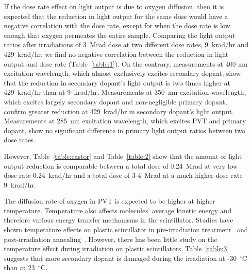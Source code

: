 \documentclass[review]{elsarticle}
\begin{document}
If the dose rate effect on light output is due to oxygen diffusion, then it is expected that the reduction in light output 
for the same dose would have a negative correlation with the dose rate, except for when the dose rate is low enough that 
oxygen permeates the entire sample. 
Comparing the light output ratios after irradiations of 3~Mrad dose at two different dose rates, 9~krad/hr and 429~krad/hr, 
we find no negative correlation between the reduction in light output and dose rate (Table~\ref{table:1}).
On the contrary, measurements at 400 nm excitation wavelength, which almost exclusively excites secondary dopant, 
show that the reduction in secondary dopant's light output is two times higher at 429~krad/hr than at 9~krad/hr.
Measurements at 350~nm excitation wavelength, which excites largely secondary dopant and non-negligible primary dopant, 
confirm greater reduction at 429~krad/hr in secondary dopant's light output. 
Measurements at 285~nm excitation wavelength, which excites PVT and primary dopant, show no significant difference 
in primary light output ratios between two dose rates. 

However, Table~\ref{table:castor} and Table~\ref{table:2} show that the amount of light output reduction is comparable 
between a total dose of 0.24~Mrad at very low dose rate 0.24~krad/hr and a total dose of 3-4~Mrad at a much higher dose rate 9~krad/hr.

The diffusion rate of oxygen in PVT is expected to be higher at higher temperature. 
Temperature also affects molecules' average kinetic energy and therefore various energy transfer mechanisms in the scintillator. 
Studies have shown temperature effects on plastic scintillator in pre-irradiation treatment~\cite{johnson} 
and post-irradiation annealing~\cite{birks1964}. 
However, there has been little study on the temperature effect during irradiation on plastic scintillators.
Table~\ref{table:3} suggests that more secondary dopant is damaged during the irradiation at -30~$^\circ$C than at 23~$^\circ$C.  
\end{document}
